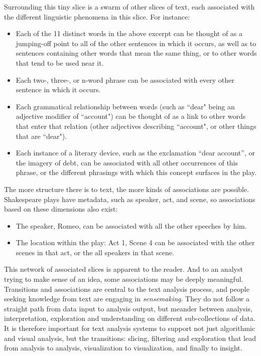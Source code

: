 \documentclass{sig-alternate}
\begin{document}
Surrounding this tiny slice is a swarm of other slices of text, each associated with the different linguistic phenomena in this slice. For instance:
\begin{itemize}
\item Each of the 11 distinct words in the above excerpt can be thought of as a jumping-off point to all of the other sentences in which it occurs, as well as to sentences containing other words that mean the same thing, or to other words that tend to be used near it.
\item Each  two-, three-, or n-word phrase can be associated with every other sentence in which it occurs.
\item  Each grammatical relationship between words (such as ``dear" being an adjective modifier of  ``account") can be thought of as a link to other words that enter that relation (other adjectives describing ``account", or other things that are ``dear").
\item Each instance of a literary device, such as the exclamation ``dear account'', or the imagery of debt, can be associated with all other occurrences of this phrase, or the different phrasings with which this concept surfaces in the play.
\end{itemize}

The more structure there is to text, the more kinds of associations are possible. Shakespeare plays have metadata, such as speaker, act, and scene, so associations based on these dimensions also exist:
\begin{itemize}
\item The speaker, Romeo, can be associated with all the other speeches by him.
\item The location within the play: Act 1, Scene 4 can be associated with the other scenes in that act, or the all speakers in that scene.
\end{itemize}

This network of associated slices is apparent to the reader. And to an analyst trying to make sense of an idea, some associations may be deeply meaningful.  Transitions  and associations are central to the text analysis process, and people seeking knowledge from text are engaging in \emph{sensemaking}. They do not follow a straight path from data input to analysis output, but meander between analysis, interpretation, exploration and understanding on different sub-collections of data.  It is therefore important for text analysis systems to support not just algorithmic and visual analysis, but the transitions: slicing, filtering and exploration that lead from analysis to analysis, visualization to visualization, and finally to insight.
\end{document}
